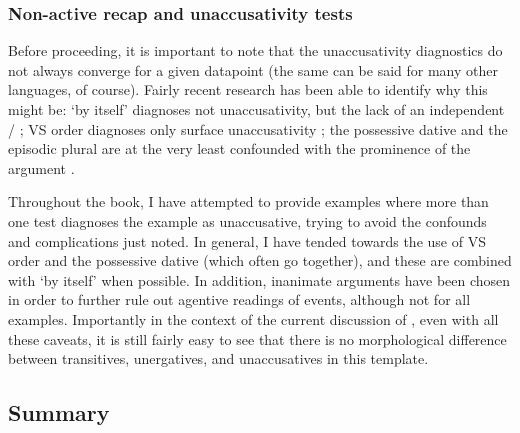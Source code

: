 \begin{exe}
\begin{xlist}
\begin{exe}
\begin{xlist}
\begin{exe}
\begin{xlist}
\begin{exe}
\begin{exe}
\begin{xlist}
\begin{exe}
\begin{xlist}
\begin{exe}
\begin{xlist}
\begin{exe}
\begin{xlist}
\begin{exe}
\begin{xlist}
\begin{exe}
\begin{xlist}
\begin{exe}
\begin{xlist}
\begin{exe}
\begin{xlist}
\begin{exe}
\begin{xlist}
\begin{exe}
\begin{xlist}
\begin{exe}
\begin{xlist}
		\subsubsection{Non-active recap and unaccusativity tests}
Before proceeding, it is important to note that the unaccusativity diagnostics do not always converge for a given datapoint (the same can be said for many other languages, of course). Fairly recent research has been able to identify why this might be: `by itself' diagnoses not unaccusativity, but the lack of an independent / \citep{layering15}; VS order diagnoses only surface unaccusativity \citep{kastner17gjgl}; the possessive dative and the episodic plural are at the very least confounded with the prominence of the argument \citep{gafter14li,linzen14pd}.

Throughout the book, I have attempted to provide examples where more than one test diagnoses the example as unaccusative, trying to avoid the confounds and complications just noted. In general, I have tended towards the use of VS order and the possessive dative (which often go together), and these are combined with `by itself' when possible. In addition, inanimate arguments have been chosen in order to further rule out agentive readings of events, although not for all examples. Importantly in the context of the current discussion of {\tkal}, even with all these caveats, it is still fairly easy to see that there is no morphological difference between transitives, unergatives,  and unaccusatives in this template.


	\subsection{Summary}


\end{xlist}
\end{exe}
\end{xlist}
\end{exe}
\end{xlist}
\end{exe}
\end{xlist}
\end{exe}
\end{xlist}
\end{exe}
\end{xlist}
\end{exe}
\end{xlist}
\end{exe}
\end{xlist}
\end{exe}
\end{xlist}
\end{exe}
\end{xlist}
\end{exe}
\end{xlist}
\end{exe}
\end{exe}
\end{xlist}
\end{exe}
\end{xlist}
\end{exe}
\end{xlist}
\end{exe}
